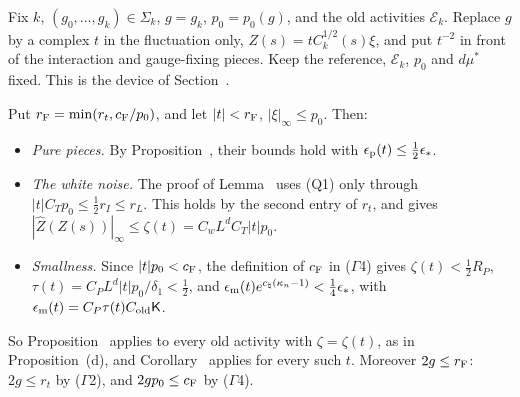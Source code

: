 \begin{step}
Fix $k$, $(g_0,\dots,g_k)\in\Sigma_k$, $g=g_k$, $p_0=p_0(g)$, and the old activities $\mathcal E_k$. Replace $g$ by a complex $t$ in the fluctuation only, $Z(s)=tC_k^{1/2}(s)\xi$, and put $t^{-2}$ in front of the interaction and gauge-fixing pieces. Keep the reference, $\mathcal E_k$, $p_0$ and $d\mu^*$ fixed. This is the device of Section~.

Put $r_{\rm F}=\min(r_t,c_{\rm F}/p_0)$, and let $|t|<r_{\rm F}$, $|\xi|_\infty\le p_0$. Then:
\begin{itemize}
\item \emph{Pure pieces.} By Proposition~, their bounds hold with $\epsilon_{\rm p}(t)\le\frac12\epsilon_*$.
\item \emph{The white noise.} The proof of Lemma~ uses (Q1) only through $|t|C_Tp_0\le\frac12r_I\le r_L$. This holds by the second entry of $r_t$, and gives $|\hat Z(Z(s))|_\infty\le\zeta(t)=C_wL^dC_T|t|p_0$.
\item \emph{Smallness.} Since $|t|p_0<c_{\rm F}$, the definition of $c_{\rm F}$ in ($\Gamma$4) gives $\zeta(t)<\frac12R_P$, $\tau(t)=C_PL^d|t|p_0/\delta_1<\frac12$, and $\epsilon_{\rm m}(t)e^{c_\natural(\kappa_n-1)}<\frac14\epsilon_*$, with $\epsilon_{\rm m}(t)=C_P\tau(t)C_{\rm old}\mathsf K$.
\end{itemize}
So Proposition~ applies to every old activity with $\zeta=\zeta(t)$, as in Proposition~(d), and Corollary~ applies for every such $t$. Moreover $2g\le r_{\rm F}$: $2g\le r_t$ by ($\Gamma$2), and $2gp_0\le c_{\rm F}$ by ($\Gamma$4).
\end{step}

